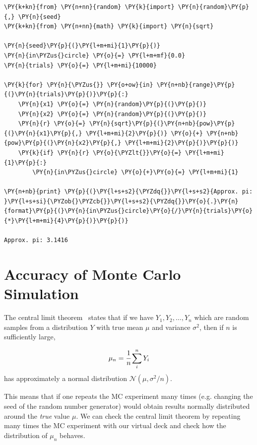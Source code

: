 \begin{codebox}
\begin{Verbatim}[commandchars=\\\{\}]
\PY{k+kn}{from} \PY{n+nn}{random} \PY{k}{import} \PY{n}{random}\PY{p}{,} \PY{n}{seed}
\PY{k+kn}{from} \PY{n+nn}{math} \PY{k}{import} \PY{n}{sqrt}
	
\PY{n}{seed}\PY{p}{(}\PY{l+m+mi}{1}\PY{p}{)}
\PY{n}{in\PYZus{}circle} \PY{o}{=} \PY{l+m+mf}{0.0}
\PY{n}{trials} \PY{o}{=} \PY{l+m+mi}{10000}
	
\PY{k}{for} \PY{n}{\PYZus{}} \PY{o+ow}{in} \PY{n+nb}{range}\PY{p}{(}\PY{n}{trials}\PY{p}{)}\PY{p}{:}
    \PY{n}{x1} \PY{o}{=} \PY{n}{random}\PY{p}{(}\PY{p}{)}
    \PY{n}{x2} \PY{o}{=} \PY{n}{random}\PY{p}{(}\PY{p}{)}
    \PY{n}{r} \PY{o}{=} \PY{n}{sqrt}\PY{p}{(}\PY{n+nb}{pow}\PY{p}{(}\PY{n}{x1}\PY{p}{,} \PY{l+m+mi}{2}\PY{p}{)} \PY{o}{+} \PY{n+nb}{pow}\PY{p}{(}\PY{n}{x2}\PY{p}{,} \PY{l+m+mi}{2}\PY{p}{)}\PY{p}{)}
    \PY{k}{if} \PY{n}{r} \PY{o}{\PYZlt{}}\PY{o}{=} \PY{l+m+mi}{1}\PY{p}{:}
        \PY{n}{in\PYZus{}circle} \PY{o}{+}\PY{o}{=} \PY{l+m+mi}{1}
	
\PY{n+nb}{print} \PY{p}{(}\PY{l+s+s2}{\PYZdq{}}\PY{l+s+s2}{Approx. pi: }\PY{l+s+si}{\PYZob{}\PYZcb{}}\PY{l+s+s2}{\PYZdq{}}\PY{o}{.}\PY{n}{format}\PY{p}{(}\PY{n}{in\PYZus{}circle}\PY{o}{/}\PY{n}{trials}\PY{o}{*}\PY{l+m+mi}{4}\PY{p}{)}\PY{p}{)}

Approx. pi: 3.1416
\end{Verbatim}
\end{codebox}

\section{Accuracy of Monte Carlo Simulation}
\label{sec:confidence_interval}

The central limit theorem~\cite{bib:central_limit} states that if we have
\(Y_1, Y_2,\dots, Y_n\) which are random samples from a distribution
\(Y\) with true mean \(\mu\) and variance \(\sigma^{2}\), then if \(n\)
is sufficiently large,

\begin{equation*} 
\mu_n = \cfrac{1}{n}\sum_i^n Y_i
\end{equation*}
 has approximately a normal distribution \(\mathcal{N}(\mu, \sigma^2/n)\).

This means that if one repeats the MC experiment many times 
(e.g. changing the seed of the random number generator) would obtain results normally distributed around the \emph{true} value \(\mu\).
We can check the central limit theorem by repeating many times the
MC experiment with our virtual deck and check how the distribution of $\mu_n$ behaves.

